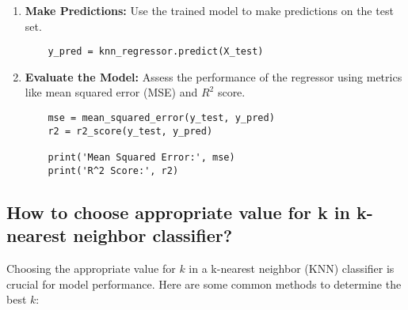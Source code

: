 \begin{enumerate}
    \item \textbf{Make Predictions:}
    Use the trained model to make predictions on the test set.

    \begin{verbatim}
    y_pred = knn_regressor.predict(X_test)
    \end{verbatim}

    \item \textbf{Evaluate the Model:}
    Assess the performance of the regressor using metrics like mean squared error (MSE) and \(R^2\) score.

    \begin{verbatim}
    mse = mean_squared_error(y_test, y_pred)
    r2 = r2_score(y_test, y_pred)

    print('Mean Squared Error:', mse)
    print('R^2 Score:', r2)
    \end{verbatim}
\end{enumerate}


\subsection{How to choose appropriate value for k in k-nearest neighbor classifier?}

Choosing the appropriate value for \( k \) in a k-nearest neighbor (KNN) classifier is crucial for model performance. Here are some common methods to determine the best \( k \):

